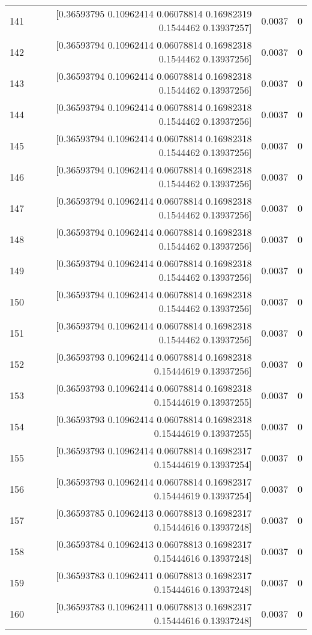 \begin{longtable}{lrrr}
141 & [0.36593795 0.10962414 0.06078814 0.16982319 0.1544462  0.13937257] & 0.0037 & 0 \\
142 & [0.36593794 0.10962414 0.06078814 0.16982318 0.1544462  0.13937256] & 0.0037 & 0 \\
143 & [0.36593794 0.10962414 0.06078814 0.16982318 0.1544462  0.13937256] & 0.0037 & 0 \\
144 & [0.36593794 0.10962414 0.06078814 0.16982318 0.1544462  0.13937256] & 0.0037 & 0 \\
145 & [0.36593794 0.10962414 0.06078814 0.16982318 0.1544462  0.13937256] & 0.0037 & 0 \\
146 & [0.36593794 0.10962414 0.06078814 0.16982318 0.1544462  0.13937256] & 0.0037 & 0 \\
147 & [0.36593794 0.10962414 0.06078814 0.16982318 0.1544462  0.13937256] & 0.0037 & 0 \\
148 & [0.36593794 0.10962414 0.06078814 0.16982318 0.1544462  0.13937256] & 0.0037 & 0 \\
149 & [0.36593794 0.10962414 0.06078814 0.16982318 0.1544462  0.13937256] & 0.0037 & 0 \\
150 & [0.36593794 0.10962414 0.06078814 0.16982318 0.1544462  0.13937256] & 0.0037 & 0 \\
151 & [0.36593794 0.10962414 0.06078814 0.16982318 0.1544462  0.13937256] & 0.0037 & 0 \\
152 & [0.36593793 0.10962414 0.06078814 0.16982318 0.15444619 0.13937256] & 0.0037 & 0 \\
153 & [0.36593793 0.10962414 0.06078814 0.16982318 0.15444619 0.13937255] & 0.0037 & 0 \\
154 & [0.36593793 0.10962414 0.06078814 0.16982318 0.15444619 0.13937255] & 0.0037 & 0 \\
155 & [0.36593793 0.10962414 0.06078814 0.16982317 0.15444619 0.13937254] & 0.0037 & 0 \\
156 & [0.36593793 0.10962414 0.06078814 0.16982317 0.15444619 0.13937254] & 0.0037 & 0 \\
157 & [0.36593785 0.10962413 0.06078813 0.16982317 0.15444616 0.13937248] & 0.0037 & 0 \\
158 & [0.36593784 0.10962413 0.06078813 0.16982317 0.15444616 0.13937248] & 0.0037 & 0 \\
159 & [0.36593783 0.10962411 0.06078813 0.16982317 0.15444616 0.13937248] & 0.0037 & 0 \\
160 & [0.36593783 0.10962411 0.06078813 0.16982317 0.15444616 0.13937248] & 0.0037 & 0 \\

\end{longtable}
